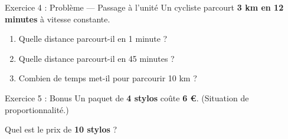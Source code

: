 \begin{problembox}{ Exercice 4 : Problème — Passage à l'unité }
	Un cycliste parcourt \textbf{3 km en 12 minutes} à vitesse constante.
	
	\begin{enumerate}[label=\textcolor{primary}{\textbf{\alph*)}},leftmargin=*]
		\item Quelle distance parcourt-il en 1 minute ? 
		
		
		\item Quelle distance parcourt-il en 45 minutes ? 
		
		
		\item Combien de temps met-il pour parcourir 10 km ? 
		
	\end{enumerate}
\end{problembox}

\exspace

\begin{exercisebox}{ Exercice 5 : Bonus }
	Un paquet de \textbf{4 stylos} coûte \textbf{6 €}. (Situation de proportionnalité.)
	
	\smallspace
	
	Quel est le prix de \textbf{10 stylos} ? 
	
\end{exercisebox}
